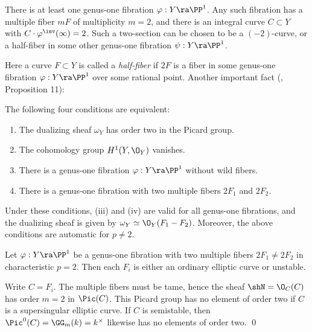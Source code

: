 \begin{proposition}
\notready
There is at least one genus-one fibration $\varphi:Y\ra\PP^1$.
Any such fibration has a multiple fiber $mF$ of multiplicity $m=2$,
and there is an integral curve $C\subset Y$ with $C\cdot \varphi^\inv(\infty)=2$.
Such a two-section can be chosen to be  a $(-2)$-curve, or a half-fiber in some other genus-one fibration $\psi:Y\ra\PP^1$.
\end{proposition}

Here a curve $F\subset Y$ is called a \emph{half-fiber} if $2F$ is a fiber in some
genus-one fibration $\varphi:Y\ra\PP^1$ over some rational point.
Another important fact (\cite{Bombieri-Mumford-1977},  Proposition 11):

\begin{proposition}
\notready
\label{omega order two}
The following four conditions are equivalent:
\begin{enumerate}
\item The dualizing sheaf $\omega_Y$ has order two in the Picard group.
\item The cohomology group $H^1(Y,\O_Y)$ vanishes.
\item There is a genus-one fibration $\varphi:Y\ra\PP^1$ without wild fibers.
\item There is a genus-one fibration with two multiple fibers $2F_1$ and $2F_2$.
\end{enumerate}
Under these conditions,   (iii) and (iv) are valid for all genus-one fibrations, and the dualizing sheaf
is given by $\omega_Y\simeq\O_Y(F_1-F_2)$. Moreover, the above conditions are automatic for $p\neq 2$.
\end{proposition}


\begin{lemma}
\notready
\label{multiple for p=2}
Let $\varphi:Y\ra\PP^1$ be a genus-one fibration with two multiple fibers $2F_1\neq 2F_2$
in characteristic $p=2$. Then each $ F_i$ is either an ordinary elliptic curve  or unstable.
\end{lemma}

\proof
Write $C=F_i$.
The   multiple fibers   must be tame, hence the   sheaf $\shN=\O_C(C)$ has order $m=2$ in
 $\Pic(C)$. This Picard group has no element of order two if $C$ is a supersingular elliptic curve.
If $C$ is semistable, then $\Pic^0(C)=\GG_m(k)=k^\times $ likewise has no elements of order two.
\qed


